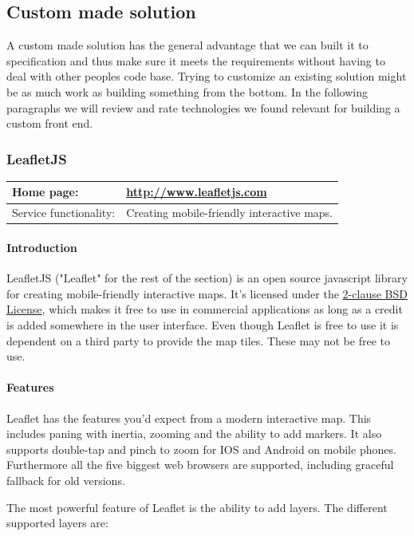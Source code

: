 \documentclass[11pt,a4paper,titlepage,oneside]{report}
\begin{document}
  \subsection{Custom made solution}
    A custom made solution has the general advantage that we can built it to specification and thus make sure it meets the requirements without having to deal with other peoples code base. Trying to customize an existing solution might be as much work as building something from the bottom. In the following paragraphs we will review and rate technologies we found relevant for building a custom front end.
    \subsubsection{LeafletJS}
    \begin{tabular}{|p{4cm}|p{8cm}|}
      \hline
      Home page: & \url{http://www.leafletjs.com} \\
      \hline
      Service functionality: & Creating mobile-friendly interactive maps. \\
      \hline
    \end{tabular}
    
    \paragraph{Introduction} \indent
    LeafletJS ("Leaflet" for the rest of the section) is an open source javascript library for creating mobile-friendly interactive maps. It's licensed under the \href{'https://github.com/Leaflet/Leaflet/blob/master/LICENSE'}{2-clause BSD License}, which makes it free to use in commercial applications as long as a credit is added somewhere in the user interface.
    Even though Leaflet is free to use it is dependent on a third party to provide the map tiles. These may not be free to use.

    \paragraph{Features}
    Leaflet has the features you'd expect from a modern interactive map. This includes paning with inertia, zooming and the ability to add markers. It also supports double-tap and pinch to zoom for IOS and Android on mobile phones. Furthermore all the five biggest web browsers are supported, including graceful fallback for old versions.
    
    The most powerful feature of Leaflet is the ability to add layers. The different supported layers are:
\end{document}
